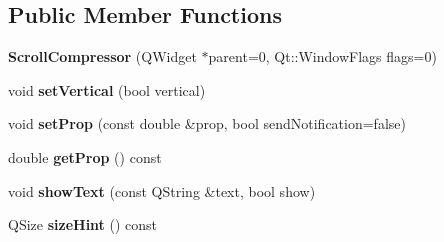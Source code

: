 \subsection*{Public Member Functions}
\begin{DoxyCompactItemize}
\item 
\hypertarget{class_scroll_compressor_a58d5858968a1f9daa1b549fa79629914}{{\bfseries Scroll\-Compressor} (Q\-Widget $\ast$parent=0, Qt\-::\-Window\-Flags flags=0)}\label{class_scroll_compressor_a58d5858968a1f9daa1b549fa79629914}

\item 
\hypertarget{class_scroll_compressor_a8bbefb60551c00625aa03c74a2e719a8}{void {\bfseries set\-Vertical} (bool vertical)}\label{class_scroll_compressor_a8bbefb60551c00625aa03c74a2e719a8}

\item 
\hypertarget{class_scroll_compressor_adebf791eb0a2ba49c9bbf4ca387bdda8}{void {\bfseries set\-Prop} (const double \&prop, bool send\-Notification=false)}\label{class_scroll_compressor_adebf791eb0a2ba49c9bbf4ca387bdda8}

\item 
\hypertarget{class_scroll_compressor_a387edddf55a88d5247f13671f585a5aa}{double {\bfseries get\-Prop} () const }\label{class_scroll_compressor_a387edddf55a88d5247f13671f585a5aa}

\item 
\hypertarget{class_scroll_compressor_a4ae64c6c885a636bf38ff8025cbf2df4}{void {\bfseries show\-Text} (const Q\-String \&text, bool show)}\label{class_scroll_compressor_a4ae64c6c885a636bf38ff8025cbf2df4}

\item 
\hypertarget{class_scroll_compressor_afebd33c95f6107729b4a4c3408689f6b}{Q\-Size {\bfseries size\-Hint} () const }\label{class_scroll_compressor_afebd33c95f6107729b4a4c3408689f6b}

\end{DoxyCompactItemize}
